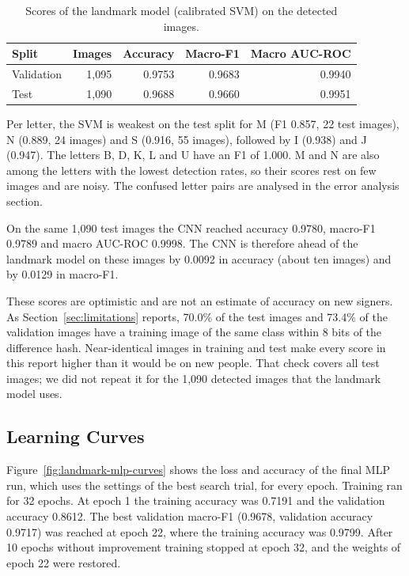 \begin{table}[htbp]
\centering
\caption{Scores of the landmark model (calibrated SVM) on the detected images.}
\label{tab:landmark-scores}
\begin{tabular}{lrrrr}
\toprule
Split & Images & Accuracy & Macro-F1 & Macro AUC-ROC \\
\midrule
Validation & 1{,}095 & 0.9753 & 0.9683 & 0.9940 \\
Test & 1{,}090 & 0.9688 & 0.9660 & 0.9951 \\
\bottomrule
\end{tabular}
\end{table}

Per letter, the SVM is weakest on the test split for M (F1 0.857, 22 test images), N (0.889, 24 images) and S (0.916, 55 images), followed by I (0.938) and J (0.947). The letters B, D, K, L and U have an F1 of 1.000. M and N are also among the letters with the lowest detection rates, so their scores rest on few images and are noisy. The confused letter pairs are analysed in the error analysis section.

On the same 1{,}090 test images the CNN reached accuracy 0.9780, macro-F1 0.9789 and macro AUC-ROC 0.9998. The CNN is therefore ahead of the landmark model on these images by 0.0092 in accuracy (about ten images) and by 0.0129 in macro-F1.

These scores are optimistic and are not an estimate of accuracy on new signers. As Section~\ref{sec:limitations} reports, 70.0\% of the test images and 73.4\% of the validation images have a training image of the same class within 8 bits of the difference hash. Near-identical images in training and test make every score in this report higher than it would be on new people. That check covers all test images; we did not repeat it for the 1{,}090 detected images that the landmark model uses.

\subsection{Learning Curves}

Figure~\ref{fig:landmark-mlp-curves} shows the loss and accuracy of the final MLP run, which uses the settings of the best search trial, for every epoch. Training ran for 32 epochs. At epoch 1 the training accuracy was 0.7191 and the validation accuracy 0.8612. The best validation macro-F1 (0.9678, validation accuracy 0.9717) was reached at epoch 22, where the training accuracy was 0.9799. After 10 epochs without improvement training stopped at epoch 32, and the weights of epoch 22 were restored.

